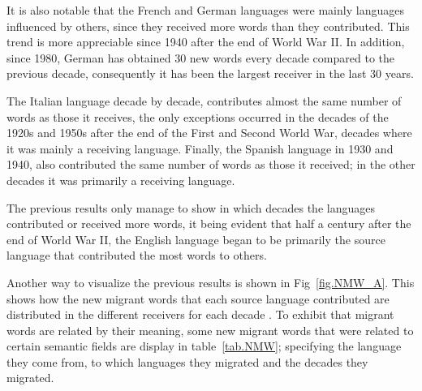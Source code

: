 \documentclass[10pt,letterpaper]{article} %
\begin{document}
	
	
	It is also notable that the French and German languages were mainly
	languages influenced by others, since they received more words than
	they contributed. This trend is more appreciable since 1940 after the end of
	World War II. In addition, since 1980, German has obtained 30 new words every
	decade compared to the previous decade, consequently it has been the largest
	receiver in the last 30 years.
	
	The Italian language decade by decade, contributes almost the same number of words as those it receives, the only exceptions occurred in the decades of the 1920s and 1950s after the end of the First and Second World War, decades where it was mainly a receiving language. Finally, the Spanish language in 1930 and 1940, also contributed the same number of words as those it received; in the other decades it was primarily a receiving language.
	
	The previous results only manage to show in which decades the languages
	contributed or received more words, it being evident that half a century after
	the end of World War II, the English language began to be primarily the source
	language that contributed the most words to others. 
	
	Another way to visualize the previous results is shown in Fig~\ref{fig.NMW_A}.
	This shows how the new migrant words that each source language contributed are
	distributed in the different receivers for each decade . To exhibit that migrant
	words are related by their meaning, some new migrant words that were related to
	certain semantic fields are display in table~\ref{tab.NMW}; specifying the
	language they come from, to which languages they migrated and the decades they
	migrated. 
	
\end{document}
